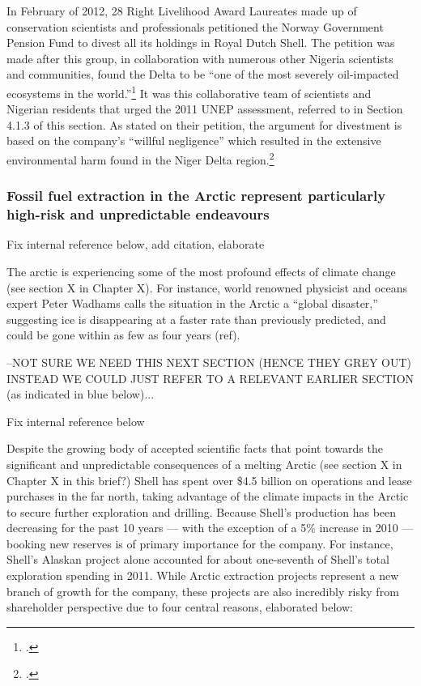In February of 2012, 28 Right Livelihood Award Laureates made up of conservation scientists and professionals petitioned the Norway Government Pension Fund to divest all its holdings in Royal Dutch Shell. 
The petition was made after this group, in collaboration with numerous other Nigeria scientists and communities, found the Delta to be ``one of the most severely oil-impacted ecosystems in the world.''\footcite[][]{NigerDeltaReport_2006}
It was this collaborative team of scientists and Nigerian residents that urged the 2011 UNEP assessment, referred to in Section 4.1.3 of this section. 
As stated on their petition, the argument for divestment is based on the company's ``willful negligence'' which resulted in the extensive environmental harm found in the Niger Delta region.\footcite[][]{NorwayPetition_2012}



	\subsubsection{Fossil fuel extraction in the Arctic represent particularly high-risk and unpredictable endeavours}

	\begin{vcom}
		Fix internal reference below, add citation, elaborate
	\end{vcom}

The arctic is experiencing some of the most profound effects of climate change (see section X in Chapter X). 
For instance, world renowned physicist and oceans expert Peter Wadhams calls the situation in the Arctic a ``global disaster,'' suggesting ice is disappearing at a faster rate than previously predicted, and could be gone within as few as four years (ref). 



\begin{vcom}
–NOT SURE WE NEED THIS NEXT SECTION (HENCE THEY GREY OUT) INSTEAD WE COULD JUST REFER TO A RELEVANT EARLIER SECTION (as indicated in blue below)...
\end{vcom}

\begin{vcom}
	Fix internal reference below
\end{vcom}

Despite the growing body of accepted scientific facts that point towards the significant and unpredictable consequences of a melting Arctic (see section X in Chapter X in this brief?) Shell has spent over \$4.5 billion on operations and lease purchases in the far north, taking advantage of the climate impacts in the Arctic to secure further exploration and drilling. 
Because Shell's production has been decreasing for the past 10 years --- with the exception of a 5\% increase in 2010  --- booking new reserves is of primary importance for the company. 
For instance, Shell's Alaskan project alone accounted for about one-seventh of Shell's total exploration spending in 2011. 
While Arctic extraction projects represent a new branch of growth for the company, these projects are also incredibly risky from shareholder perspective due to four central reasons, elaborated below:

